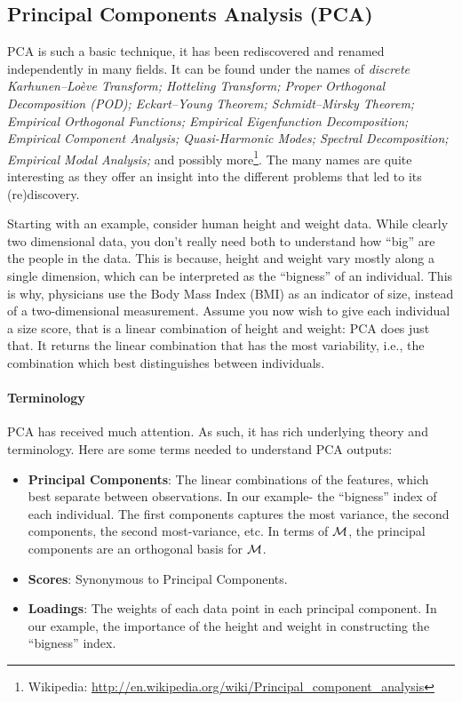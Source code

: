 \subsection{Principal Components Analysis (PCA)}
\label{sec:pca}

PCA is such a basic technique, it has been rediscovered and renamed independently in many fields. 
It can be found under the names of \emph{discrete Karhunen–Loève Transform; Hotteling Transform; Proper Orthogonal Decomposition (POD); Eckart–Young Theorem; Schmidt–Mirsky Theorem;  Empirical Orthogonal Functions; Empirical Eigenfunction Decomposition;  Empirical Component Analysis;  Quasi-Harmonic Modes;  Spectral Decomposition;  Empirical Modal Analysis;} and possibly more\footnote{Wikipedia: \url{http://en.wikipedia.org/wiki/Principal_component_analysis} }.
The many names are quite interesting as they offer an insight into the different problems that led to its (re)discovery.

Starting with an example, consider human height and weight data. 
While clearly two dimensional data, you don't really need both to understand how ``big'' are the people in the data. 
This is because, height and weight vary mostly along a single dimension, which can be interpreted as the ``bigness'' of an individual. 
This is why, physicians use the Body Mass Index (BMI) as an indicator of size, instead of a two-dimensional measurement.
Assume you now wish to give each individual a size score, that is a linear combination of height and weight: PCA does just that. It returns the linear combination that has the most variability, i.e., the combination which best distinguishes between individuals. 


\paragraph{Terminology}
PCA has received much attention. As such, it has rich underlying theory and terminology.
Here are some terms needed to understand PCA outputs:
\begin{itemize}
\item \textbf{Principal Components}:  The linear combinations of the features, which best separate between observations. In our example- the ``bigness'' index of each individual. The first components captures the most variance, the second components, the second most-variance, etc. In terms of $\mathcal{M}$, the principal components are an orthogonal basis for $\mathcal{M}$.
\item \textbf{Scores}: Synonymous to Principal Components.
\item \textbf{Loadings}: The weights of each data point in each principal component. In our example, the importance of the height and weight in constructing the ``bigness'' index.
\end{itemize}


